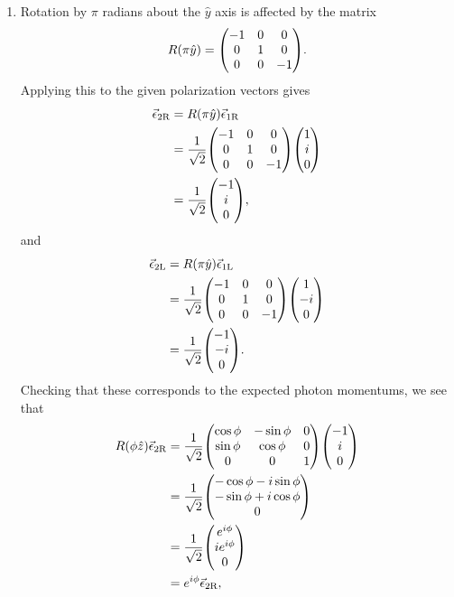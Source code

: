 \documentclass[12pt]{article}
\begin{document}
\begin{enumerate}[label=(\alph*)]
    \item Rotation by $\pi$ radians about the $\hat{y}$ axis is affected by the matrix
    \[ R(\pi\hat{y}) = \mqty(-1&0&0\\0&1&0\\0&0&-1). \]
    Applying this to the given polarization vectors gives
    \begin{align*}
        \vec{\epsilon}_{2\text{R}} &= R(\pi\hat{y})\vec{\epsilon}_{1\text{R}} \\
        &= \frac{1}{\sqrt{2}}\mqty(-1&0&0\\0&1&0\\0&0&-1)\mqty(1\\i\\0) \\
        &= \frac{1}{\sqrt{2}}\mqty(-1\\i\\0),
    \end{align*}
    and 
    \begin{align*}
        \vec{\epsilon}_{2\text{L}} &= R(\pi\hat{y})\vec{\epsilon}_{1\text{L}} \\
        &= \frac{1}{\sqrt{2}}\mqty(-1&0&0\\0&1&0\\0&0&-1)\mqty(1\\-i\\0) \\
        &= \frac{1}{\sqrt{2}}\mqty(-1\\-i\\0).
    \end{align*}
    Checking that these corresponds to the expected photon momentums, we see that
    \begin{align*}
        R(\phi\hat{z})\vec{\epsilon}_{2\text{R}} &= \frac{1}{\sqrt{2}}\mqty(\cos\phi & -\sin\phi & 0 \\ \sin\phi & \cos\phi & 0 \\ 0 & 0 & 1)\mqty(-1\\i\\0) \\
        &= \frac{1}{\sqrt{2}}\mqty(-\cos\phi - i\sin\phi \\ -\sin\phi + i\cos\phi \\ 0) \\
        &= \frac{1}{\sqrt{2}}\mqty(e^{i\phi} \\ ie^{i\phi} \\ 0) \\
        &= e^{i\phi}\vec{\epsilon}_{2\text{R}},
    \end{align*}

\end{enumerate}
\end{document}
